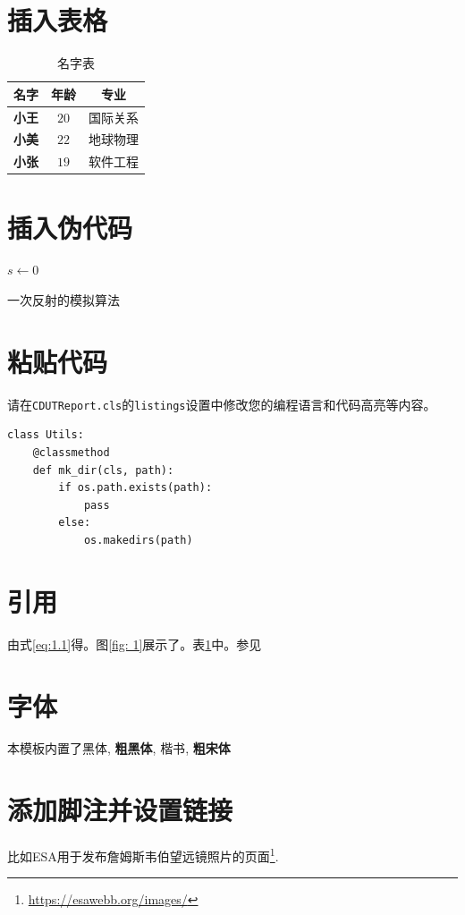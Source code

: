 \section{插入表格} 

\begin{table}[H]
    \centering
    \caption{名字表}
    \label{table: 1}
    \begin{tabular}{ccc}
        \hline
        名字 & 年龄 & 专业 \\
        \hline
        \textbf{小王} & $20$ & 国际关系 \\
        \textbf{小美} & $22$ & 地球物理\\
        \textbf{小张} & $19$ & 软件工程 \\
        \hline
    \end{tabular}
\end{table}

\section{插入伪代码}

\begin{spacing}{1.0}  %
    \begin{algorithm}[H]
        \SetAlgoLined
        $s \leftarrow 0$ \;
        \caption{一次反射的模拟算法}
    \end{algorithm}
\end{spacing}

\section{粘贴代码}
请在\texttt{CDUTReport.cls}的\texttt{listings}设置中修改您的编程语言和代码高亮等内容。
\begin{spacing}{1.0}
\begin{lstlisting}
class Utils:
    @classmethod
    def mk_dir(cls, path):
        if os.path.exists(path):
            pass
        else:
            os.makedirs(path)
\end{lstlisting}
\end{spacing}

\section{引用}
由式\ref{eq:1.1}得。图\ref{fig: 1}展示了。表\ref{table: 1}中。参见\cite{Landou}


\section{字体}
本模板内置了{\heiti 黑体}, {\bfseries\heiti 粗黑体}, {\kaishu 楷书}, {\bfseries\songti 粗宋体}


\section{添加脚注并设置链接}

比如ESA用于发布詹姆斯韦伯望远镜照片的页面\footnote{\url{https://esawebb.org/images/}}.